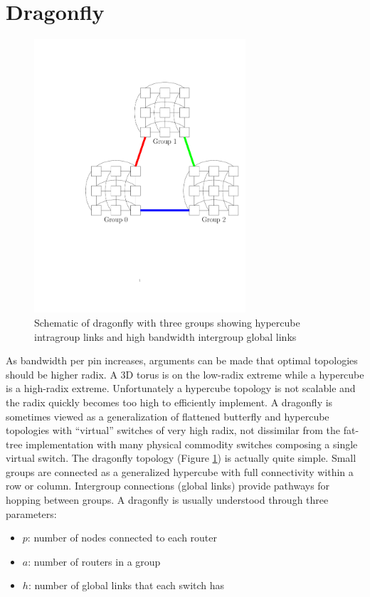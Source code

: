 
\section{Dragonfly}
\label{sec:tutorial:dragonfly}

\begin{figure}[h!]
\centering
\includegraphics[width=0.7\textwidth]{figures/tikz/dragonfly/dragonfly.pdf}
\caption{Schematic of dragonfly with three groups showing hypercube intragroup links and high bandwidth intergroup global links}
\label{fig:topologies:dragonfly}
\end{figure}

As bandwidth per pin increases, arguments can be made that optimal topologies should be higher radix.
A 3D torus is on the low-radix extreme while a hypercube is a high-radix extreme.
Unfortunately a hypercube topology is not scalable and the radix quickly becomes too high to efficiently implement.
A dragonfly is sometimes viewed as a generalization of flattened butterfly and hypercube topologies with ``virtual'' switches of very high radix,
not dissimilar from the fat-tree implementation with many physical commodity switches composing a single virtual switch.
The dragonfly topology (Figure \ref{fig:topologies:dragonfly}) is actually quite simple. 
Small groups are connected as a generalized hypercube with full connectivity within a row or column.
Intergroup connections (global links) provide pathways for hopping between groups.
A dragonfly is usually understood through three parameters:
\begin{itemize}
\item $p$: number of nodes connected to each router
\item $a$: number of routers in a group
\item $h$: number of global links that each switch has
\end{itemize}

